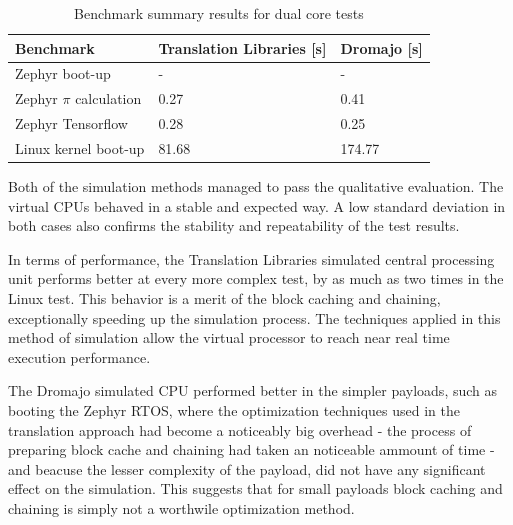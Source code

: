 \begin{table}[h]
    \centering
    \begin{tabular}{l|l|l}
    Benchmark             & Translation Libraries [s] & Dromajo [s]  \\ \hline
    Zephyr boot-up        & -                     & -        \\ \hline
    Zephyr $\pi$ calculation & 0.27               & 0.41     \\ \hline
    Zephyr Tensorflow     & 0.28                  & 0.25     \\ \hline
    Linux kernel boot-up  & 81.68                 & 174.77
    \end{tabular}
    \caption{Benchmark summary results for dual core tests}
\end{table}

\noindent
Both of the simulation methods managed to pass the qualitative evaluation. The virtual CPUs behaved in a stable
and expected way. A low standard deviation in both cases also confirms the stability and repeatability of the test
results.

In terms of performance, the Translation Libraries simulated central processing unit performs better at every more
complex test, by as much as two times in the Linux test. This behavior is a merit of the block caching and chaining,
exceptionally speeding up the simulation process. The techniques applied in this method of simulation allow the virtual
processor to reach near real time execution performance.

The Dromajo simulated CPU performed better in the simpler payloads, such as booting the Zephyr RTOS, where the
optimization techniques used in the translation approach had become a noticeably big overhead - the process of
preparing block cache and chaining had taken an noticeable ammount of time - and beacuse the lesser complexity of the payload,
did not have any significant effect on the simulation. This suggests that for small payloads block caching and chaining is simply not a worthwile optimization method.
